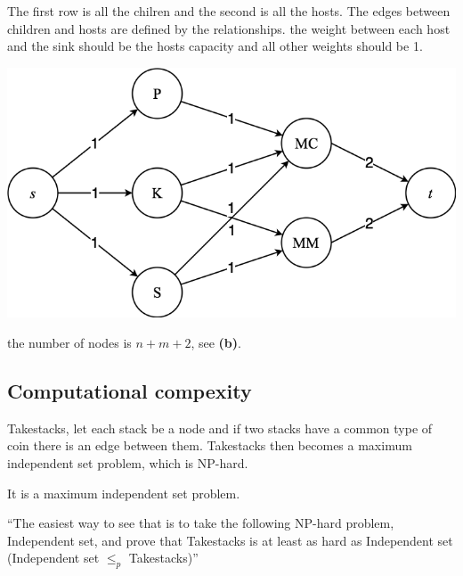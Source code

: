 \documentclass[a4paper]{article}
\newenvironment{task}[1]
{
	\begin{description}[align=right]
		\item [#1]
}{		%
	\end{description}
}
\newcommand{\taskref}[1]{\textbf{#1}}
\DeclareMathOperator{\*}{\cdot}
\begin{document}
\begin{task}{(b)}
	\qquad The first row is all the chilren and the second is all the hosts. The edges between children and hosts are defined by the relationships. the weight between each host and the sink should be the hosts capacity and all other weights should be 1.
	
	\includegraphics[scale=0.3]{130529-6b.png}
\end{task}

\begin{task}{(c)}
	 the number of nodes is $n+m+2$, see \taskref{(b)}.
\end{task}

\subsection*{Computational compexity}

\begin{task}{7. (a)}
	 Takestacks, let each stack be a node and if two stacks have a common type of coin there is an edge between them. Takestacks then becomes a maximum independent set problem, which is NP-hard.
\end{task}

\begin{task}{(b)}
	 It is a maximum independent set problem.
\end{task}

\begin{task}{(c)}
	 ``The easiest way to see that is to take the following NP-hard problem, Independent set, and prove that Takestacks is at least as hard as Independent set (Independent set $\leq_p$ Takestacks)''
\end{task}
\end{document}
